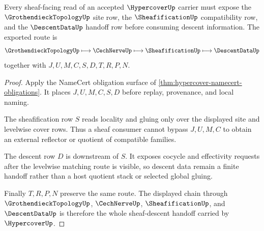 \begin{theorem}
\label{thm:hypercover-sheaf-descent-handoff}
Every sheaf-facing read of an accepted $\HypercoverUp$ carrier must expose the $\GrothendieckTopologyUp$ site row, the $\SheafificationUp$ compatibility row, and the $\DescentDataUp$ handoff row before consuming descent information. The exported route is
$$
\GrothendieckTopologyUp \longmapsto \CechNerveUp \longmapsto \SheafificationUp \longmapsto \DescentDataUp
$$
together with $J,U,M,C,S,D,T,R,P,N$.
\end{theorem}
\begin{proof}
Apply the NameCert obligation surface of \autoref{thm:hypercover-namecert-obligations}. It places $J,U,M,C,S,D$ before replay, provenance, and local naming.

The sheafification row $S$ reads locality and gluing only over the displayed site and levelwise cover rows. Thus a sheaf consumer cannot bypass $J,U,M,C$ to obtain an external reflector or quotient of compatible families.

The descent row $D$ is downstream of $S$. It exposes cocycle and effectivity requests after the levelwise matching route is visible, so descent data remain a finite handoff rather than a host quotient stack or selected global gluing.

Finally $T,R,P,N$ preserve the same route. The displayed chain through $\GrothendieckTopologyUp$, $\CechNerveUp$, $\SheafificationUp$, and $\DescentDataUp$ is therefore the whole sheaf-descent handoff carried by $\HypercoverUp$.
\end{proof}

